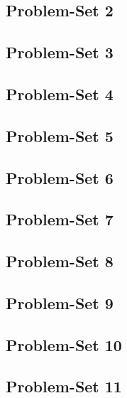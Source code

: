 \begin{problem}
\end{problem}
\begin{solution*}
\end{solution*}

\begin{problem}
\end{problem}
\begin{solution*}
\end{solution*}

\begin{problem}
\end{problem}
\begin{solution*}
\end{solution*}

\subsection{Problem-Set 2}
\subsection{Problem-Set 3}
\subsection{Problem-Set 4}
\subsection{Problem-Set 5}
\subsection{Problem-Set 6}
\subsection{Problem-Set 7}
\subsection{Problem-Set 8}
\subsection{Problem-Set 9}
\subsection{Problem-Set 10}
\subsection{Problem-Set 11}

